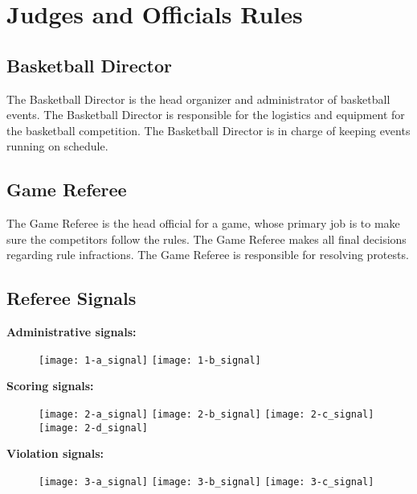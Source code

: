 \chapter{Judges and Officials Rules}

\section{Basketball Director}

The Basketball Director is the head organizer and administrator of basketball events.
The Basketball Director is responsible for the logistics and equipment for the basketball competition.
The Basketball Director is in charge of keeping events running on schedule.

\section{Game Referee}

The Game Referee is the head official for a game, whose primary job is to make sure the competitors follow the rules.
The Game Referee makes all final decisions regarding rule infractions.
The Game Referee is responsible for resolving protests.

\newpage
\section{Referee Signals}

\textbf{Administrative signals:}

\begin{figure}[h]
\texttt{[image: 1-a\_signal]}
\texttt{[image: 1-b\_signal]}
\end{figure}

\textbf{Scoring signals:}
\begin{figure}[h]
\texttt{[image: 2-a\_signal]}
\texttt{[image: 2-b\_signal]}
\texttt{[image: 2-c\_signal]}
\texttt{[image: 2-d\_signal]}
\end{figure}

\textbf{Violation signals:}

\begin{figure}[h]
\texttt{[image: 3-a\_signal]}
\texttt{[image: 3-b\_signal]}
\texttt{[image: 3-c\_signal]}
\end{figure}
